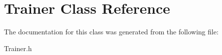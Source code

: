 \hypertarget{classTrainer}{}\section{Trainer Class Reference}
\label{classTrainer}


The documentation for this class was generated from the following file\+:\begin{DoxyCompactItemize}
\item 
Trainer.\+h\end{DoxyCompactItemize}
